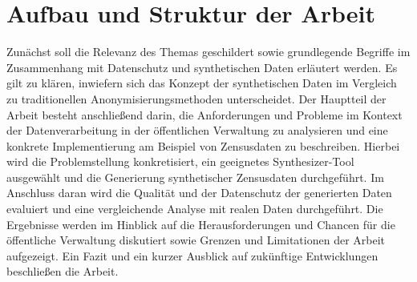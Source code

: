 \section{Aufbau und Struktur der Arbeit}
\label{sec:aufbau}
\begin{spacing}{1.5}

Zunächst soll die Relevanz des Themas geschildert sowie grundlegende Begriffe im Zusammenhang mit Datenschutz und synthetischen Daten erläutert werden. Es gilt zu klären, inwiefern sich das Konzept der synthetischen Daten im Vergleich zu traditionellen Anonymisierungsmethoden unterscheidet. Der Hauptteil der Arbeit besteht anschließend darin, die Anforderungen und Probleme im Kontext der Datenverarbeitung in der öffentlichen Verwaltung zu analysieren und eine konkrete Implementierung am Beispiel von Zensusdaten zu beschreiben. Hierbei wird die Problemstellung konkretisiert, ein geeignetes Synthesizer-Tool ausgewählt und die Generierung synthetischer Zensusdaten durchgeführt. Im Anschluss daran wird die Qualität und der Datenschutz der generierten Daten evaluiert und eine vergleichende Analyse mit realen Daten durchgeführt. Die Ergebnisse werden im Hinblick auf die Herausforderungen und Chancen für die öffentliche Verwaltung diskutiert sowie Grenzen und Limitationen der Arbeit aufgezeigt. Ein Fazit und ein kurzer Ausblick auf zukünftige Entwicklungen beschließen die Arbeit.

\end{spacing}